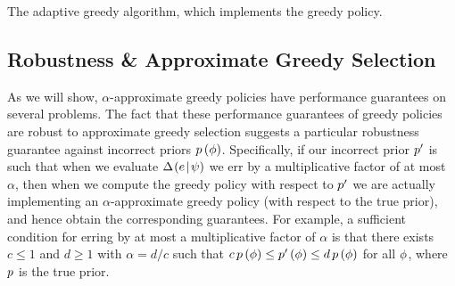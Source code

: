 %
\begin{algorithm}
 \label{alg:greedy} \caption{The adaptive greedy
algorithm, which implements the greedy policy.}
\end{algorithm}


\subsection{Robustness \& Approximate Greedy Selection}
\label{sec:robustness}
As we will show, $\alpha$-approximate greedy policies have 
performance guarantees on several problems.
The fact that these performance guarantees of greedy policies are
robust to approximate greedy selection suggests a particular
robustness guarantee against incorrect priors ${\color{black}{\ensuremath{p \left( {{\color{black}{\ensuremath{\phi}}}} \right) }}}$.
Specifically, if our incorrect prior ${\color{black}{\ensuremath{p}}}'$ is such that when we evaluate
$\Delta \hspace{-0.3mm} \left( { {e}\! \mid \! {{\color{black}{\ensuremath{\psi}}}} } \right)  $ we err by a multiplicative factor of at most
$\alpha$, then when we compute the greedy policy with respect to
${\color{black}{\ensuremath{p}}}'$ we are actually implementing an $\alpha$-approximate
greedy policy (with respect to the true prior), and hence obtain the
corresponding guarantees.  For example, a sufficient condition for
erring by at most a multiplicative factor of $\alpha$ is 
that there exists $c \le 1$ and $d \ge 1$ with $\alpha = d/c$ such that 
 $c\,{\color{black}{\ensuremath{p \left( {{\color{black}{\ensuremath{\phi}}}} \right) }}} \le {\color{black}{\ensuremath{p}}}' \left( {{\color{black}{\ensuremath{\phi}}}} \right)  \le
 d\,{\color{black}{\ensuremath{p \left( {{\color{black}{\ensuremath{\phi}}}} \right) }}}$ for all ${\color{black}{\ensuremath{\phi}}}$, where ${\color{black}{\ensuremath{p}}}$ is the true prior.

